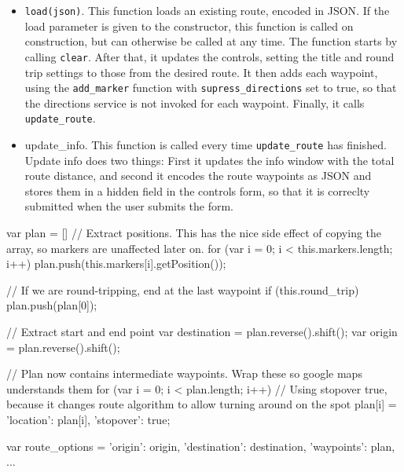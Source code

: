 \begin{itemize}
 \item \texttt{load(json)}. This function loads an existing route, encoded in \ac{JSON}. If the load parameter is given to the constructor, this function is called on construction, but can otherwise be called at any time. The function starts by calling \texttt{clear}. After that, it updates the controls, setting the title and round trip settings to those from the desired route. It then adds each waypoint, using the \texttt{add\_marker} function with \texttt{supress\_directions} set to true, so that the directions service is not invoked for each waypoint. Finally, it calls \texttt{update\_route}.
 \item{update\_info}. This function is called every time \texttt{update\_route} has finished. Update info does two things: First it updates the info window with the total route distance, and second it encodes the route waypoints as \ac{JSON} and stores them in a hidden field in the controls form, so that it is correclty submitted when the user submits the form.
\end{itemize}

\begin{code}[label={lst:update-route-1}, caption={Converting a List of Waypoints for Directions}, language={JavaScript}]
var plan = []
// Extract positions. This has the nice side effect of copying the array, so markers are unaffected later on.
for (var i = 0; i < this.markers.length; i++)
{
	plan.push(this.markers[i].getPosition());
}

// If we are round-tripping, end at the last waypoint
if (this.round_trip)
	plan.push(plan[0]);

// Extract start and end point
var destination = plan.reverse().shift();
var origin = plan.reverse().shift();

// Plan now contains intermediate waypoints. Wrap these so google maps understands them
for (var i = 0; i < plan.length; i++)
{
	// Using stopover true, because it changes route algorithm to allow turning around on the spot
	plan[i] = {'location': plan[i], 'stopover': true};
}
		
var route_options = {'origin': origin,
					 'destination': destination,
					 'waypoints': plan,
					 ...}
\end{code}


